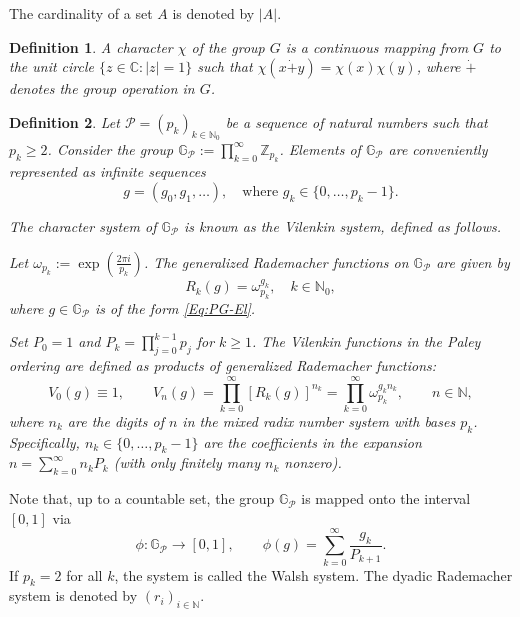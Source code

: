 \documentclass[12pt]{article}
\newtheorem{definition}{Definition}
\begin{document}
The cardinality of a set $A$ is denoted by $|A|$.

\begin{definition}
	A \textit{character} $\chi$ of the group $G$ is a continuous mapping from $G$ to the unit circle $\{z \in \mathbb{C} : |z|=1\}$ such that $\chi(x \dot{+} y) = \chi(x)\chi(y)$, where $\dot{+}$ denotes the group operation in $G$.
\end{definition}

\begin{definition} \label{dfn4} 
	Let $\mathcal{P} = (p_k)_{k \in \mathbb{N}_0}$ be a sequence of natural numbers such that $p_k \ge 2$. Consider the group $\mathbb{G}_{\mathcal{P}} := \prod_{k=0}^{\infty} \mathbb{Z}_{p_k}$. Elements of $\mathbb{G}_{\mathcal{P}}$ are conveniently represented as infinite sequences 
	\begin{equation}
		\label{Eq:PG-El}  g = (g_0, g_1, \dots), \quad \text{where } g_k \in \{0, \ldots, p_k-1\}.
	\end{equation}  
	
	The character system of $\mathbb{G}_{\mathcal{P}}$ is known as the Vilenkin system, defined as follows.
	
	Let $\omega_{p_k} := \exp\left(\frac{2\pi i}{p_k}\right)$. The \textit{generalized Rademacher functions} on $\mathbb{G}_{\mathcal{P}}$ are given by
	\begin{equation*}
		R_k(g) = \omega_{p_k}^{g_k}, \quad k \in \mathbb{N}_0,
	\end{equation*}
	where $g \in \mathbb{G}_{\mathcal{P}}$ is of the form \eqref{Eq:PG-El}.
	
	Set $P_0 = 1$ and $P_k = \prod_{j=0}^{k-1} p_j$ for $k \ge 1$. The Vilenkin functions in the Paley ordering are defined as products of generalized Rademacher functions:
	\begin{equation}
		V_0(g) \equiv 1, \qquad V_n(g) = \prod_{k=0}^{\infty} [R_k(g)]^{n_k} 
		= \prod_{k=0}^{\infty} \omega_{p_k}^{g_k n_k}, \qquad n \in \mathbb{N}, 
	\end{equation}
	where $n_k$ are the digits of $n$ in the mixed radix number system with bases $p_k$. Specifically, $n_k \in \{0, \ldots, p_k-1\}$ are the coefficients in the expansion 
	$n = \sum_{k=0}^\infty n_k P_k$ (with only finitely many $n_k$ nonzero).
\end{definition}

Note that, up to a countable set, the group $\mathbb{G}_{\mathcal{P}}$ is mapped onto the interval $[0,1]$ via
$$\phi: \mathbb{G}_{\mathcal{P}} \to [0,1], \qquad \phi(g) = \sum_{k=0}^{\infty} \frac{g_k}{P_{k+1}}.$$
If $p_k = 2$ for all $k$, the system is called the Walsh system. The dyadic Rademacher system is denoted by $(r_i)_{i\in \mathbb{N}}$. 
\end{document}
